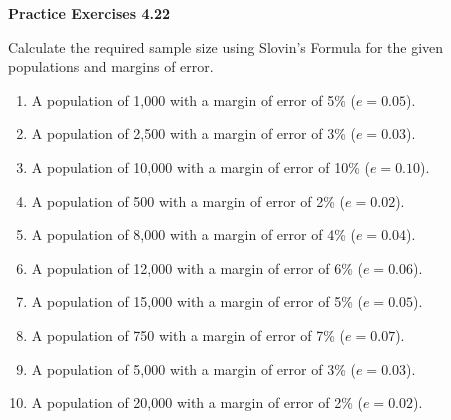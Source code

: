 \vspace{0.3ex}
\noindent\textbf{Practice Exercises 4.22}

\vspace{0.2ex}

Calculate the required sample size using Slovin’s Formula for the given populations and margins of error.

\begin{enumerate}
    \item A population of 1,000 with a margin of error of 5\% (\(e = 0.05\)).
    \item A population of 2,500 with a margin of error of 3\% (\(e = 0.03\)).
    \item A population of 10,000 with a margin of error of 10\% (\(e = 0.10\)).
    \item A population of 500 with a margin of error of 2\% (\(e = 0.02\)).
    \item A population of 8,000 with a margin of error of 4\% (\(e = 0.04\)).
    \item A population of 12,000 with a margin of error of 6\% (\(e = 0.06\)).
    \item A population of 15,000 with a margin of error of 5\% (\(e = 0.05\)).
    \item A population of 750 with a margin of error of 7\% (\(e = 0.07\)).
    \item A population of 5,000 with a margin of error of 3\% (\(e = 0.03\)).
    \item A population of 20,000 with a margin of error of 2\% (\(e = 0.02\)).
\end{enumerate}
